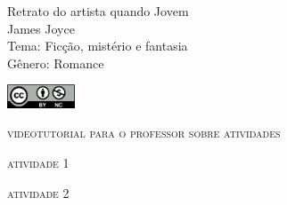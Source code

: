 \documentclass[smaller,professionalfonts,15pt]{beamer}
\begin{document}
										\begin{frame}\begin{raggedleft}
										\Huge 
Retrato do artista quando Jovem						\\
										\huge 
James Joyce							\\
										\bigskip
										\normalsize
Tema: Ficção, mistério e fantasia		\\	
Gênero: Romance 			\\\vfill\hfill
\publishername

										\end{raggedleft}

\smallskip\includegraphics[width=2cm]{ccbync.png}\hfill
\end{frame}


\begin{frame}{\textsc{videotutorial para o professor sobre atividades}}
\vspace{-2cm}\begin{figure}
\end{figure}
\end{frame}


\begin{frame}
\hfill\Huge
\textsc{atividade 1}
\end{frame}


\begin{frame}
\hfill\Huge
\textsc{atividade 2}
\end{frame}
\end{document}

